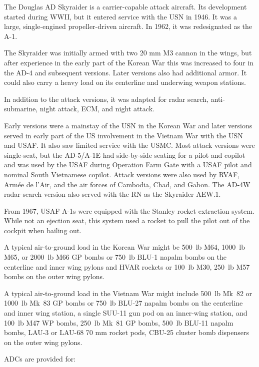 
The Douglas AD Skyraider is a carrier-capable attack aircraft. Its development started during WWII, but it entered service with the USN in 1946. It was a large, single-engined propeller-driven aircraft. In 1962, it was redesignated as the A-1.

The Skyraider was initially armed with two 20 mm M3 cannon in the wings, but after experience in the early part of the Korean War this was increased to four in the AD-4 and subsequent versions. Later versions also had additional armor. It could also carry a heavy load on its centerline and underwing weapon stations.

In addition to the attack versions, it was adapted for radar search, anti-submarine, night attack, ECM, and night attack.

Early versions were a mainstay of the USN in the Korean War and later versions served in early part of the US involvement in the Vietnam War with the USN and USAF. It also saw limited service with the USMC. Most attack versions were single-seat, but the AD-5/A-1E had side-by-side seating for a pilot and copilot and was used by the USAF during Operation Farm Gate with a USAF pilot and nominal South Vietnamese copilot. Attack versions were also used by RVAF, Armée de l'Air, and the air forces of Cambodia, Chad, and Gabon. The AD-4W radar-search version also served with the RN as the Skyraider AEW.1.

From 1967, USAF A-1s were equipped with the Stanley rocket extraction system. While not an ejection seat, this system used a rocket to pull the pilot out of the cockpit when bailing out.

A typical air-to-ground load in the Korean War might be 500~lb M64, 1000~lb M65, or 2000~lb M66 GP bombs or 750~lb BLU-1 napalm bombs on the centerline and inner wing pylons and HVAR rockets or 100~lb M30, 250~lb M57 bombs on the outer wing pylons.

A typical air-to-ground load in the Vietnam War might include 500~lb Mk~82 or 1000~lb Mk~83 GP bombs or 750~lb BLU-27 napalm bombs on the centerline and inner wing station, a single SUU-11 gun pod on an inner-wing station, and 100~lb M47 WP bombs, 250~lb Mk~81 GP bombs, 500~lb BLU-11 napalm bombs, LAU-3 or LAU-68 70 mm rocket pods, CBU-25 cluster bomb dispensers on the outer wing pylons.

ADCs are provided for:
\begin{adclist}
\end{adclist}